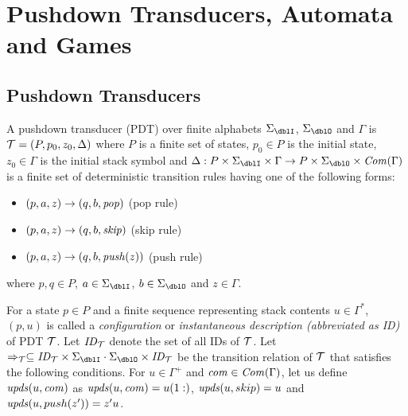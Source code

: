 \section{Pushdown Transducers, Automata and Games}
\subsection{Pushdown Transducers}
\begin{definition}
A {pushdown transducer} (PDT)
over finite alphabets $\Sigma_\dblI$, $\Sigma_\dblO$ and $\Gamma$
is ${\cal T}=(P, p_0, z_0, \Delta)$ where
$P$ is a finite set of states,
$p_0\in P$ is the initial state,
$z_0\in \Gamma$ is the initial stack symbol and
$\Delta: P\times \Sigma_\dblI \times \Gamma \to P\times \Sigma_\dblO \times \Com(\Gamma)$ is a finite set of deterministic transition rules having one of the following forms:
\begin{itemize}
\item $(p, a, z) \rightarrow (q, b, \mathit{pop})$ \quad (pop rule)
\item $(p, a, z) \rightarrow (q, b, \mathit{skip})$ \quad (skip rule)
\item $(p, a, z) \rightarrow (q, b, \mathit{push}(z))$ \quad (push rule)
\end{itemize}
where $p, q\in P$, $a\in\Sigma_\dblI$, $b\in\Sigma_\dblO$ and $z\in\Gamma$.
\end{definition}
\noindent
For a state $p\in P$ and
a finite sequence representing stack contents $u \in \Gamma^*$,
$(p, u)$ is called
a {\em configuration} or {\em instantaneous description (abbreviated as ID)} of PDT ${\cal T}$. Let $\mathit{ID}_{\cal T}$ denote the set of all IDs of ${\cal T}$.
Let $\Rightarrow_\calT\subseteq \ID_\calT\times \Sigma_\dblI\cdot\Sigma_\dblO\times \ID_\calT$ be the transition relation of ${\cal T}$ that satisfies the following conditions.
For $u\in\Gamma^+$ and $\mathit{com}\in\mathit{Com}(\Gamma)$, let us define $\mathit{upds}(u,\mathit{com})$
as $\mathit{upds}(u,\mathit{com})=u(1:)$, $\mathit{upds}(u,skip)=u$ and $\mathit{upds}(u,push(z'))=z'u$.

